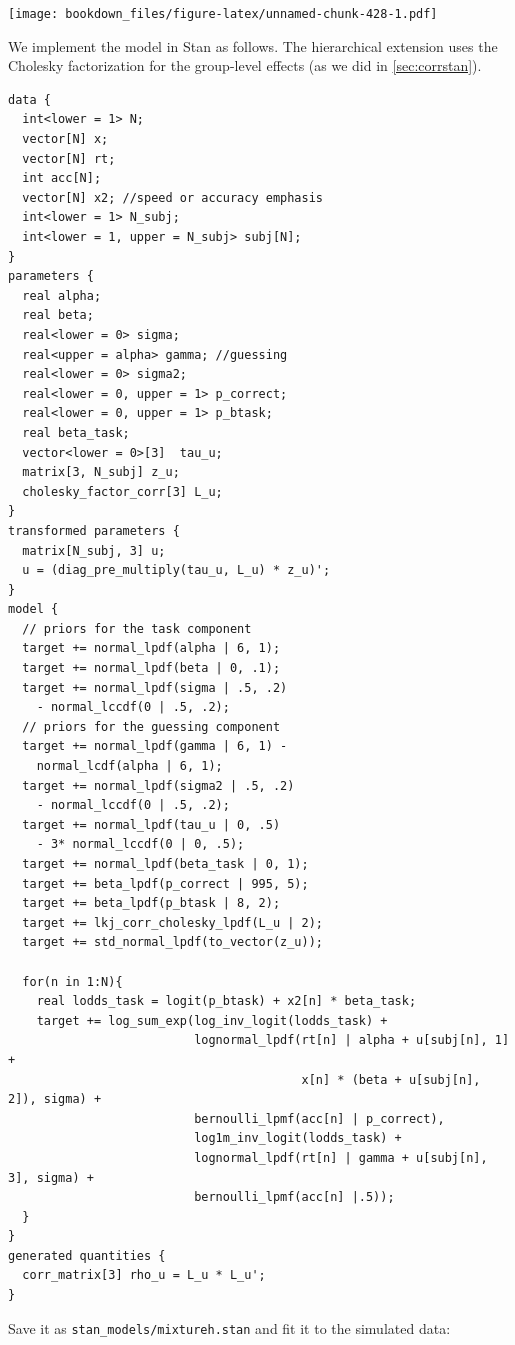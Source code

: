 \documentclass[12pt,]{krantz}
\theoremstyle{definition}
\theoremstyle{definition}
\theoremstyle{definition}
\theoremstyle{remark}
\begin{document}
\texttt{[image: bookdown\_files/figure-latex/unnamed-chunk-428-1.pdf]}

We implement the model in Stan as follows. The hierarchical extension uses the Cholesky factorization for the group-level effects (as we did in \ref{sec:corrstan}).

\begin{verbatim}
data {
  int<lower = 1> N;
  vector[N] x;
  vector[N] rt;
  int acc[N];
  vector[N] x2; //speed or accuracy emphasis
  int<lower = 1> N_subj;
  int<lower = 1, upper = N_subj> subj[N];
}
parameters {
  real alpha;
  real beta;
  real<lower = 0> sigma;
  real<upper = alpha> gamma; //guessing
  real<lower = 0> sigma2;
  real<lower = 0, upper = 1> p_correct;
  real<lower = 0, upper = 1> p_btask;
  real beta_task;
  vector<lower = 0>[3]  tau_u;   
  matrix[3, N_subj] z_u;
  cholesky_factor_corr[3] L_u;
}
transformed parameters {
  matrix[N_subj, 3] u;
  u = (diag_pre_multiply(tau_u, L_u) * z_u)';
}
model {
  // priors for the task component
  target += normal_lpdf(alpha | 6, 1);
  target += normal_lpdf(beta | 0, .1);
  target += normal_lpdf(sigma | .5, .2)
    - normal_lccdf(0 | .5, .2);
  // priors for the guessing component
  target += normal_lpdf(gamma | 6, 1) - 
    normal_lcdf(alpha | 6, 1);
  target += normal_lpdf(sigma2 | .5, .2)
    - normal_lccdf(0 | .5, .2);
  target += normal_lpdf(tau_u | 0, .5)
    - 3* normal_lccdf(0 | 0, .5);
  target += normal_lpdf(beta_task | 0, 1);
  target += beta_lpdf(p_correct | 995, 5);
  target += beta_lpdf(p_btask | 8, 2);
  target += lkj_corr_cholesky_lpdf(L_u | 2);
  target += std_normal_lpdf(to_vector(z_u));

  for(n in 1:N){
    real lodds_task = logit(p_btask) + x2[n] * beta_task;
    target += log_sum_exp(log_inv_logit(lodds_task) +
                          lognormal_lpdf(rt[n] | alpha + u[subj[n], 1] +
                                         x[n] * (beta + u[subj[n], 2]), sigma) +
                          bernoulli_lpmf(acc[n] | p_correct),
                          log1m_inv_logit(lodds_task) +
                          lognormal_lpdf(rt[n] | gamma + u[subj[n], 3], sigma) +
                          bernoulli_lpmf(acc[n] |.5));
  }
}
generated quantities {
  corr_matrix[3] rho_u = L_u * L_u';
}
\end{verbatim}

Save it as \texttt{stan\_models/mixtureh.stan} and fit it to the simulated data:
\end{document}
